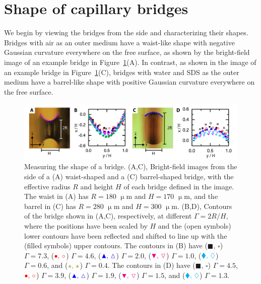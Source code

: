 \section{Shape of capillary bridges}
We begin by viewing the bridges from the side and characterizing their shapes.
Bridges with air as an outer medium have a waist-like shape with negative Gaussian curvature everywhere on the free surface, as shown by the bright-field image of an example bridge in Figure~\ref{f:5-ShapeContour}(A).
In contrast, as shown in the image of an example bridge in Figure~\ref{f:5-ShapeContour}(C), bridges with water and SDS as the outer medium have a barrel-like shape with positive Gaussian curvature everywhere on the free surface.
\begin{figure}
  \centering
  \includegraphics{figures/C5/Ch5-Figs_ShapeContour.png}
  \caption{Measuring the shape of a bridge.
  (A,C), Bright-field images from the side of a (A) waist-shaped and a (C) barrel-shaped bridge, with the effective radius $R$ and height $H$ of each bridge defined in the image.
  The waist in (A) has $R = 180$ $\upmu$m and $H = 170$ $\upmu$m, and the barrel in (C) has $R = 280$ $\upmu$m and $H = 300$ $\upmu$m.
  (B,D), Contours of the bridge shown in (A,C), respectively, at different $\Gamma = 2R/H$, where the positions have been scaled by $H$ and the (open symbols) lower contours have been reflected and shifted to line up with the (filled symbols) upper contours.
  The contours in (B) have (${\blacksquare,\, \square}$) $\Gamma = 7.3$,
   (${\color{red} \bullet,\, \circ}$) $\Gamma = 4.6$,
   (${\color{blue} \blacktriangle,\, \vartriangle}$) $\Gamma = 2.0$,
   (${\color{magenta} \blacktriangledown,\, \triangledown}$) $\Gamma = 1.0$,
   (${\color{cyan} \blacklozenge,\, \lozenge}$) $\Gamma = 0.6$, and
   (${\color{olive} \star,\, \star}$) $\Gamma = 0.4$.
  The contours in (D) have (${\blacksquare,\, \square}$) $\Gamma = 4.5$,
  ${\color{red} \bullet,\, \circ}$) $\Gamma = 3.9$,
  (${\color{blue} \blacktriangle,\, \vartriangle}$) $\Gamma = 1.9$,
  (${\color{magenta} \blacktriangledown,\, \triangledown}$) $\Gamma = 1.5$, and
  (${\color{cyan} \blacklozenge,\, \lozenge}$) $\Gamma = 1.3$.}\label{f:5-ShapeContour}
\end{figure}


